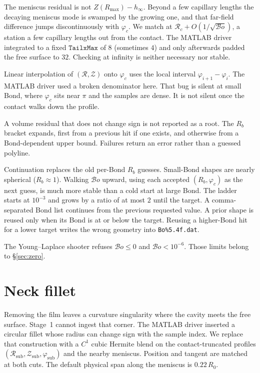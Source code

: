 \documentclass[11pt,a4paper]{article}
\newcommand{\Bo}{\mathcal{B}o}
\newcommand{\Rb}{R_b}
\newcommand{\Rzero}{R_0}
\begin{document}
The meniscus residual is not $Z(R_{\max})-h_\infty$. Beyond a few
capillary lengths the decaying meniscus mode is swamped by the growing
one, and that far-field difference jumps discontinuously with
$\varphi_c$. We match at
$\mathcal{R}_c + O(1/\sqrt{\Bo})$, a station a few capillary lengths
out from the contact. The MATLAB driver integrated to a fixed
$\texttt{TailxMax}$ of $8$ (sometimes $4$) and only afterwards padded
the free surface to $32$. Checking at infinity is neither necessary
nor stable.

Linear interpolation of $(\mathcal{R},\mathcal{Z})$ onto $\varphi_c$
uses the local interval $\varphi_{i+1}-\varphi_i$. The MATLAB driver
used a broken denominator here. That bug is silent at small Bond, where
$\varphi_c$ sits near $\pi$ and the samples are dense. It is not silent
once the contact walks down the profile.

A volume residual that does not change sign is not reported as a root.
The $\Rb$ bracket expands, first from a previous hit if one exists, and
otherwise from a Bond-dependent upper bound. Failures return an error
rather than a guessed polyline.

Continuation replaces the old per-Bond $\Rb$ guesses. Small-Bond shapes
are nearly spherical ($\Rb\approx 1$). Walking $\Bo$ upward, using each
accepted $(\Rb,\varphi_c)$ as the next guess, is much more stable than a
cold start at large Bond. The ladder starts at $10^{-3}$ and grows by a
ratio of at most $2$ until the target. A comma-separated Bond list
continues from the previous requested value. A prior shape is reused
only when its Bond is at or below the target. Reusing a higher-Bond hit
for a lower target writes the wrong geometry into
\texttt{Bo\%5.4f.dat}.

The Young--Laplace shooter refuses $\Bo\le 0$ and
$\Bo<10^{-6}$. Those limits belong to \S\ref{sec:zero}.

\section{Neck fillet}
\label{sec:fillet}

Removing the film leaves a curvature singularity where the cavity meets
the free surface. Stage~1 cannot ingest that corner. The MATLAB driver
inserted a circular fillet whose radius can change sign with the sample
index. We replace that construction with a $C^1$ cubic Hermite blend on
the contact-truncated profiles $(\mathcal{R}_{\mathrm{sub}},
\mathcal{Z}_{\mathrm{sub}}, \varphi_{\mathrm{sub}})$ and the nearby
meniscus. Position and tangent are matched at both cuts. The default
physical span along the meniscus is $0.22\,\Rzero$.
\end{document}
